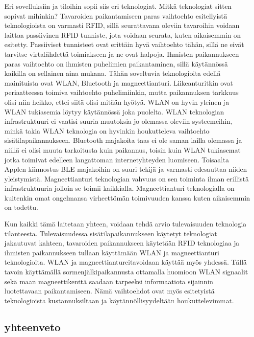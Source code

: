Eri sovelluksiin ja tiloihin sopii siis eri teknologiat. Mitkä teknologiat sitten sopivat mihinkin? Tavaroiden paikantamiseen paras vaihtoehto esitellyistä teknologioista on varmasti RFID, sillä seurattavana oleviin tavaroihin voidaan laittaa passiivinen RFID tunniste, jota voidaan seurata, kuten aikaisemmin on esitetty. Passiiviset tunnisteet ovat erittäin hyvä vaihtoehto tähän, sillä ne eivät tarvitse virtalähdettä toimiakseen ja ne ovat halpoja\cite{F}. Ihmisten paikannukseen paras vaihtoehto on ihmisten puhelimien paikantaminen, sillä käytännössä kaikilla on sellainen aina mukana. Tähän soveltuvia teknologioita edellä mainituista ovat WLAN, Bluetooth ja magneettianturi. Liikeanturitkin ovat periaatteessa toimiva vaihtoehto puhelimiinkin, mutta paikannuksen tarkkuus olisi niin heikko, ettei siitä olisi mitään hyötyä. WLAN on hyvin yleinen ja WLAN tukiasemia löytyy käytännössä joka puolelta. WLAN teknologian infrastruktuuri ei vaatisi suuria muutoksia jo olemassa oleviin systeemeihin, minkä takia WLAN teknologia on hyvinkin houkutteleva vaihtoehto sisätilapaikannukseen. Bluetooth majakoita taas ei ole saman lailla olemassa ja niillä ei olisi muuta tarkoitusta kuin paikannus, toisin kuin WLAN tukiasemat jotka toimivat edelleen langattoman internetyhteyden luomiseen. Toisaalta Applen kiinnostus BLE majakoihin on suuri tekijä ja varmasti edesauttaa niiden yleistymistä. Magneettianturi teknologian vahvuus on sen toiminta ilman erillistä infrastruktuuria jolloin se toimii kaikkialla. Magneettianturi teknologialla on kuitenkin omat ongelmansa virheettömän toimivuuden kanssa kuten aikaisemmin on todettu. 

Kun kaikki tämä laitetaan yhteen, voidaan tehdä arvio tulevaisuuden teknologia tilanteesta. Tulevaisuudessa sisätilapaikannukseen käytetyt teknologiat jakautuvat kahteen, tavaroiden paikannukseen käytetään RFID teknologiaa ja ihmisten paikannukseen tullaan käyttämään WLAN ja magneettianturi teknologioita. WLAN ja magneettiantureitavoidaan käyttää myös yhdessä\cite{atlas}. Tällä tavoin käyttämällä sormenjälkipaikannusta ottamalla huomioon WLAN signaalit sekä maan magneettikenttä saadaan tarpeeksi informaatiota sijainnin luotettavaan paikantamiseen. Nämä vaihtoehdot ovat myös esitetyistä teknologioista kustannuksiltaan ja käytännöllisyydeltään houkuttelevimmat.
%
\subsection{yhteenveto}

